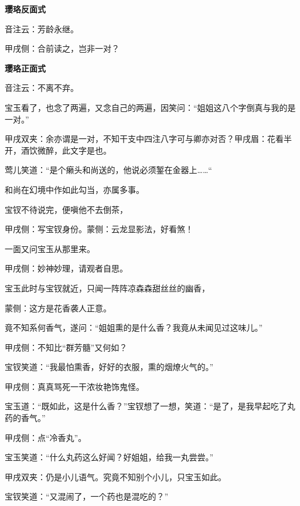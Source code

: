 \begin{qute}

    \begin{parag}
        \textbf{璎珞反面式}
    \end{parag}


    \begin{parag}
        音注云：芳龄永继。\begin{note}甲戌侧：合前读之，岂非一对？\end{note}
    \end{parag}


    \begin{parag}
        \textbf{璎珞正面式}
    \end{parag}


    \begin{parag}
        音注云：不离不弃。
    \end{parag}
\end{qute}


\begin{parag}
    宝玉看了，也念了两遍，又念自己的两遍，因笑问：“姐姐这八个字倒真与我的是一对。”\begin{note}甲戌双夹：余亦谓是一对，不知干支中四注八字可与卿亦对否？甲戌眉：花看半开，酒饮微醉，此文字是也。\end{note}莺儿笑道：“是个癞头和尚送的，他说必须錾在金器上……“\begin{note}和尚在幻境中作如此勾当，亦属多事。\end{note}宝钗不待说完，便嗔他不去倒茶，\begin{note}甲戌侧：写宝钗身份。蒙侧：云龙显影法，好看煞！\end{note}一面又问宝玉从那里来。\begin{note}甲戌侧：妙神妙理，请观者自思。\end{note}
\end{parag}


\begin{parag}
    宝玉此时与宝钗就近，只闻一阵阵凉森森甜丝丝的幽香，\begin{note}蒙侧：这方是花香袭人正意。\end{note}竟不知系何香气，遂问：“姐姐熏的是什么香？我竟从未闻见过这味儿。”\begin{note}甲戌侧：不知比“群芳髓”又何如？\end{note}宝钗笑道：“我最怕熏香，好好的衣服，熏的烟燎火气的。”\begin{note}甲戌侧：真真骂死一干浓妆艳饰鬼怪。\end{note}宝玉道：“既如此，这是什么香？”宝钗想了一想，笑道：“是了，是我早起吃了丸药的香气。”\begin{note}甲戌侧：点“冷香丸”。\end{note}宝玉笑道：“什么丸药这么好闻？好姐姐，给我一丸尝尝。”\begin{note}甲戌双夹：仍是小儿语气。究竟不知别个小儿，只宝玉如此。\end{note}宝钗笑道：“又混闹了，一个药也是混吃的？”
\end{parag}


